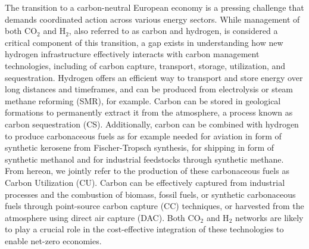 \documentclass[twocolumn]{article}
\newcommand{\COtwo}{CO$_2$}
\newcommand{\Htwo}{H$_2$}
\begin{document}
The transition to a carbon-neutral European economy is a pressing challenge that demands coordinated action across various energy sectors. While management of both \COtwo{} and \Htwo{}, also referred to as carbon and hydrogen, is considered a critical component of this transition, a gap exists in understanding how new hydrogen infrastructure effectively interacts with carbon management technologies, including of carbon capture, transport, storage, utilization, and sequestration. Hydrogen offers an efficient way to transport and store energy over long distances and timeframes, and can be produced from electrolysis or steam methane reforming (SMR), for example. Carbon can be stored in geological formations to permanently extract it from the atmosphere, a process known as carbon sequestration (CS). Additionally, carbon can be combined with hydrogen to produce carbonaceous fuels as for example needed for aviation in form of synthetic kerosene from Fischer-Tropsch synthesis, for shipping in form of synthetic methanol and for industrial feedstocks through synthetic methane. From hereon, we jointly refer to the production of these carbonaceous fuels as Carbon Utilization (CU). Carbon can be effectively captured from industrial processes and the combustion of biomass, fossil fuels, or synthetic carbonaceous fuels through point-source carbon capture (CC) techniques, or harvested from the atmosphere using direct air capture (DAC). Both \COtwo{} and \Htwo{} networks are likely to play a crucial role in the cost-effective integration of these technologies to enable net-zero economies.
\end{document}
